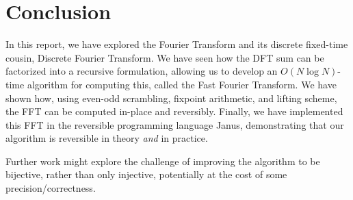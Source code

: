 \section{Conclusion}
In this report, we have explored the Fourier Transform and its discrete fixed-time cousin,
Discrete Fourier Transform.
We have seen how the DFT sum can be factorized into a recursive formulation,
allowing us to develop an $O(N \log N)$-time algorithm for computing this,
called the Fast Fourier Transform.
We have shown how, using even-odd scrambling, fixpoint arithmetic,
and lifting scheme, the FFT can be computed in-place and reversibly.
Finally, we have implemented this FFT in the reversible programming language Janus,
demonstrating that our algorithm is reversible in theory \textit{and} in practice.

Further work might explore the challenge of improving the algorithm to be bijective,
rather than only injective, potentially at the cost of some precision/correctness.
